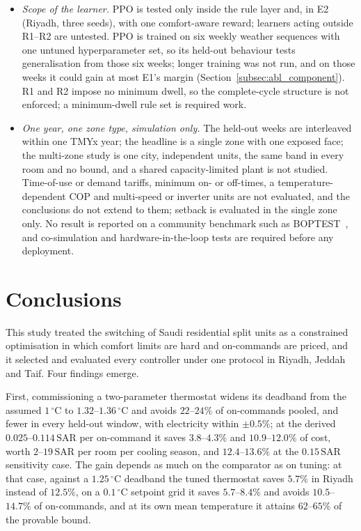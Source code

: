 \documentclass[3p,twocolumn,number]{elsarticle}
\newcommand{\SAR}{\text{SAR}}
\begin{document}
\begin{itemize}[leftmargin=*,itemsep=1pt,topsep=2pt]
\item \emph{Scope of the learner.} PPO is tested only inside the rule layer and,
in E2 (Riyadh, three seeds), with one comfort-aware reward; learners acting outside R1--R2 are untested. PPO is trained on six weekly weather sequences with one untuned hyperparameter set, so its held-out behaviour tests generalisation from those six weeks; longer training was not run, and on those weeks it could gain at most E1's margin (Section~\ref{subsec:abl_component}). R1 and R2 impose no minimum dwell, so the complete-cycle structure is not enforced; a minimum-dwell rule set is required work.
\item \emph{One year, one zone type, simulation only.} The held-out weeks are
interleaved within one TMYx year; the headline is a single zone with one exposed face; the multi-zone study is one city, independent units, the same band in every room and no bound, and a shared capacity-limited plant is not studied. Time-of-use or demand tariffs, minimum on- or off-times, a temperature-dependent COP and multi-speed or inverter units are not evaluated, and the conclusions do not extend to them; setback is evaluated in the single zone only. No result is reported on a community benchmark such as BOPTEST~\cite{Blum2021}, and co-simulation and hardware-in-the-loop tests are required before any deployment.
\end{itemize}

\section{Conclusions}
\label{sec:conclusion}

This study treated the switching of Saudi residential split units as a constrained optimisation in which comfort limits are hard and on-commands are priced, and it selected and evaluated every controller under one protocol in Riyadh, Jeddah and Taif. Four findings emerge.

First, commissioning a two-parameter thermostat widens its deadband from the assumed $1\,^\circ$C to $1.32$--$1.36\,^\circ$C and avoids $22$--$24\%$ of on-commands pooled, and fewer in every held-out window, with electricity within $\pm0.5\%$; at the derived $0.025$--$0.114\,\SAR$ per on-command it saves $3.8$--$4.3\%$ and $10.9$--$12.0\%$ of cost, worth $2$--$19\,\SAR$ per room per cooling season, and $12.4$--$13.6\%$ at the $0.15\,\SAR$ sensitivity case. The gain depends as much on the comparator as on tuning: at that case, against a $1.25\,^\circ$C deadband the tuned thermostat saves $5.7\%$ in Riyadh instead of $12.5\%$, on a $0.1\,^\circ$C setpoint grid it saves $5.7$--$8.4\%$ and avoids $10.5$--$14.7\%$ of on-commands, and at its own mean temperature it attains $62$--$65\%$ of the provable bound.
\end{document}
